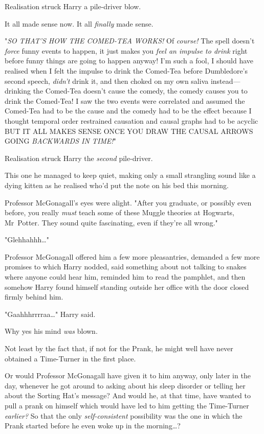 Realisation struck Harry a pile-driver blow.

It all made sense now. It all \emph{finally} made sense.

"\emph{SO THAT'S HOW THE COMED-TEA WORKS!} Of \emph{course!} The spell doesn't
\emph{force} funny events to happen, it just makes you \emph{feel an impulse to
drink} right before funny things are going to happen anyway! I'm such a fool, I
should have realised when I felt the impulse to drink the Comed-Tea before
Dumbledore's second speech, \emph{didn't} drink it, and then choked on my own
saliva instead—drinking the Comed-Tea doesn't cause the comedy, the comedy
causes you to drink the Comed-Tea! I saw the two events were correlated and
assumed the Comed-Tea had to be the cause and the comedy had to be the effect
because I thought temporal order restrained causation and causal graphs had to
be acyclic BUT IT ALL MAKES SENSE ONCE YOU DRAW THE CAUSAL ARROWS GOING
\emph{BACKWARDS IN TIME!}"

Realisation struck Harry the \emph{second} pile-driver.

This one he managed to keep quiet, making only a small strangling sound like a
dying kitten as he realised who'd put the note on his bed this morning.

Professor McGonagall's eyes were alight. "After you graduate, or possibly even
before, you really \emph{must} teach some of these Muggle theories at Hogwarts,
Mr~Potter. They sound quite fascinating, even if they're all wrong."

"Glehhahhh…"

Professor McGonagall offered him a few more pleasantries, demanded a few more
promises to which Harry nodded, said something about not talking to snakes
where anyone could hear him, reminded him to read the pamphlet, and then
somehow Harry found himself standing outside her office with the door closed
firmly behind him.

"Gaahhhrrrraa…" Harry said.

Why yes his mind \emph{was} blown.

Not least by the fact that, if not for the Prank, he might well have never
obtained a Time-Turner in the first place.

Or would Professor McGonagall have given it to him anyway, only later in the
day, whenever he got around to asking about his sleep disorder or telling her
about the Sorting Hat's message? And would he, at that time, have wanted to
pull a prank on himself which would have led to him getting the Time-Turner
\emph{earlier?} So that the only \emph{self-consistent} possibility was the one
in which the Prank started before he even woke up in the morning…?


